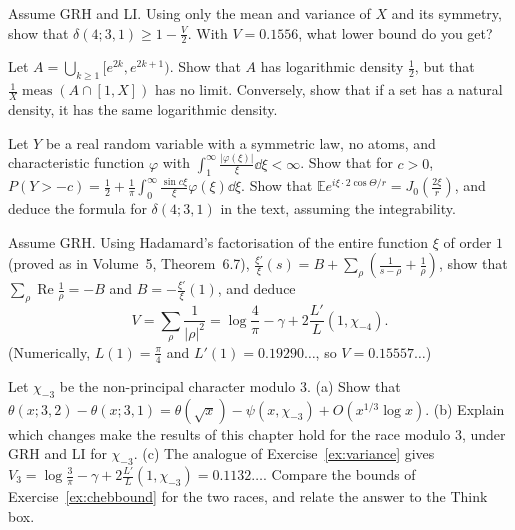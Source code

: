 \begin{exercise}[$\star$]\label{ex:chebbound}
Assume GRH and LI. Using only the mean and variance of $X$ and its symmetry, show that $\delta(4;3,1)\ge1-\frac V2$. With $V=0.1556$, what lower bound do you get?
\end{exercise}

\begin{exercise}[$\star$]\label{ex:logdensity}
Let $A=\bigcup_{k\ge1}[e^{2k},e^{2k+1})$. Show that $A$ has logarithmic density $\frac12$, but that $\frac1X\operatorname{meas}(A\cap[1,X])$ has no limit. Conversely, show that if a set has a natural density, it has the same logarithmic density.
\end{exercise}

\begin{exercise}[$\star\star$]\label{ex:gilpelaez}
Let $Y$ be a real random variable with a symmetric law, no atoms, and characteristic function $\varphi$ with $\int_1^\infty\frac{|\varphi(\xi)|}\xi\dd\xi<\infty$. Show that for $c>0$, $P(Y>-c)=\frac12+\frac1\pi\int_0^\infty\frac{\sin c\xi}\xi\varphi(\xi)\dd\xi$. Show that $\mathbb Ee^{i\xi\cdot2\cos\Theta/r}=J_0(\frac{2\xi}r)$, and deduce the formula for $\delta(4;3,1)$ in the text, assuming the integrability.
\end{exercise}

\begin{exercise}[$\star\star\star$]\label{ex:variance}
Assume GRH. Using Hadamard's factorisation of the entire function $\xi$ of order $1$ (proved as in Volume~5, Theorem~6.7), $\frac{\xi'}\xi(s)=B+\sum_\rho(\frac1{s-\rho}+\frac1\rho)$, show that $\sum_\rho\operatorname{Re}\frac1\rho=-B$ and $B=-\frac{\xi'}\xi(1)$, and deduce
\[
V=\sum_\rho\frac1{|\rho|^2}=\log\frac4\pi-\gamma+2\frac{L'}L(1,\chi_{-4}).
\]
(Numerically, $L(1)=\frac\pi4$ and $L'(1)=0.19290\ldots$, so $V=0.15557\ldots$)
\end{exercise}

\begin{exercise}[$\star\star$]\label{ex:mod3}
Let $\chi_{-3}$ be the non-principal character modulo $3$. (a) Show that $\theta(x;3,2)-\theta(x;3,1)=\theta(\sqrt x)-\psi(x,\chi_{-3})+O(x^{1/3}\log x)$. (b) Explain which changes make the results of this chapter hold for the race modulo $3$, under GRH and LI for $\chi_{-3}$. (c) The analogue of Exercise~\ref{ex:variance} gives $V_3=\log\frac3\pi-\gamma+2\frac{L'}L(1,\chi_{-3})=0.1132\ldots$. Compare the bounds of Exercise~\ref{ex:chebbound} for the two races, and relate the answer to the Think box.
\end{exercise}

